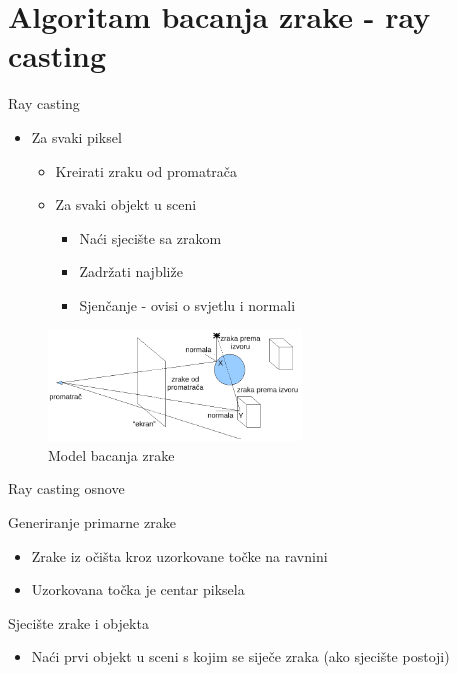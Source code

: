 \documentclass[9pt]{beamer}
\begin{document}
\section{Algoritam bacanja zrake - ray casting}
\begin{frame}{Ray casting}
\begin{itemize}
	\item Za svaki piksel
	\begin{itemize}
		\item Kreirati zraku od promatrača
		\item Za svaki objekt u sceni
		\begin{itemize}
			\item Naći sjecište sa zrakom
			\item Zadržati najbliže
			\item Sjenčanje - ovisi o svjetlu i normali
		\end{itemize}
	\end{itemize}
\end{itemize}
\begin{figure}
	 \includegraphics[width=0.6\textwidth]{./slike/model_bacanja_zrake.png}
	 \caption{Model bacanja zrake}
\end{figure}
\end{frame}	

\begin{frame}{Ray casting osnove}
\begin{block}{Generiranje primarne zrake}
	\begin{itemize}
		\item Zrake iz očišta kroz uzorkovane točke na ravnini
		\item Uzorkovana točka je centar piksela
	\end{itemize}
\end{block}
\begin{block}{Sjecište zrake i objekta}
	\begin{itemize}
		\item Naći prvi objekt u sceni s kojim se siječe zraka (ako sjecište postoji)
	\end{itemize}
\end{block}
\end{frame}
\end{document}
